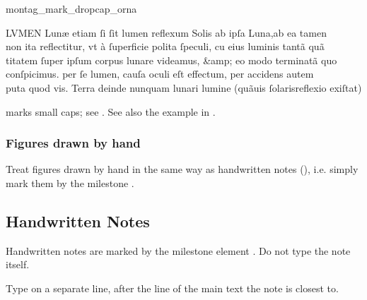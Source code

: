 \begin{sampleImage}{montag_mark_dropcap_orna}

\begin{typeLatin}
LVMEN Lunæ etiam ſi ſit lumen reflexum Solis ab ipſa Luna,\lwr ab ea tamen \\
non ita reflectitur, vt à ſuperficie polita ſpeculi, c\bs\tld{}u eius luminis tantã quã \\
titatem ſuper ipſum corpus lunare videamus, &amp; eo modo terminatã quo \\
conſpicimus. per ſe lumen, cauſa oculi eſt effectum, per accidens autem \\
puta quod vis. Terra deinde nunquam lunari lumine (quãuis ſolaris\lwr reflexio exiſtat) \\
\someText {}
\end{typeLatin}
\end{sampleImage}

\vspace{-2mm}

\begin{crossref}
 marks small caps; see . See also the example in .
\end{crossref}

\subsubsection{Figures drawn by hand}
Treat figures drawn by hand in the same way as handwritten notes (), i.e. simply mark them by the milestone .

\tocspace
\subsection{Handwritten Notes}
\label{section handwritten notes}

\begin{mainrule}
Handwritten notes are marked by the milestone element . Do not type the note itself.
\end{mainrule}

\begin{clarification}
Type  on a separate line, after the line of the main text the note is closest to.
\end{clarification}

